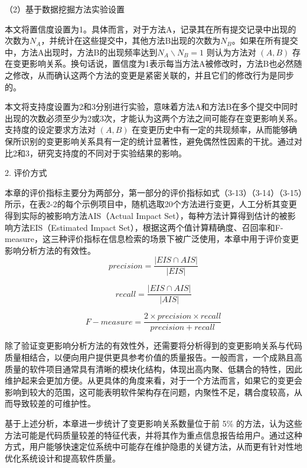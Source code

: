 （2）基于数据挖掘方法实验设置

本文将置信度设置为1。具体而言，对于方法A，记录其在所有提交记录中出现的次数为\(N_A\)，并统计在这些提交中，其他方法B出现的次数为\(N_B\)。如果在所有提交中，方法A出现时，方法B的出现频率达到\(N_A \backslash N_B = 1\)
则认为方法对 $(A, B)$ 存在变更影响关系。换句话说，置信度为1表示每当方法A被修改时，方法B也必然随之修改，从而确认这两个方法的变更是紧密关联的，并且它们的修改行为是同步的。

本文将支持度设置为2和3分别进行实验，意味着方法A和方法B在多个提交中同时出现的次数必须至少为2或3次，才能认为这两个方法之间可能存在变更影响关系。支持度的设定要求方法对 $(A, B)$ 在变更历史中有一定的共现频率，从而能够确保所识别的变更影响关系具有一定的统计显著性，避免偶然性因素的干扰。通过对比2和3，研究支持度的不同对于实验结果的影响。

2. 评价方式

本章的评价指标主要分为两部分，第一部分的评价指标如式（3-13）（3-14）（3-15）所示，在表2-2的每个示例项目中，随机选取20个方法进行变更，人工分析其变更得到实际的被影响方法AIS（Actual Impact Set），每种方法计算得到估计的被影响方法EIS（Estimated Impact Set），根据这两个值计算精确度、召回率和F-measure，这三种评价指标在信息检索的场景下被广泛使用，本章中用于评价变更影响分析方法的有效性。
\begin{equation}
{precision} = \frac{|EIS \cap AIS|}{|EIS|}
\end{equation}

\begin{equation}
{recall} = \frac{|EIS \cap AIS|}{|AIS|}
\end{equation}

\begin{equation}
F-measure = \frac{2 \times precision \times recall}{precision + recall}
\end{equation}

除了验证变更影响分析方法的有效性外，还需要将分析得到的变更影响关系与代码质量相结合，以便向用户提供更具参考价值的质量报告。一般而言，一个成熟且高质量的软件项目通常具有清晰的模块化结构，体现出高内聚、低耦合的特性，因此维护起来会更加方便。从更具体的角度来看，对于一个方法而言，如果它的变更会影响到较大的范围，这可能表明软件架构存在问题，内聚性不足，耦合度较高，从而导致较差的可维护性。

基于上述分析，本章进一步统计了变更影响关系数量位于前 5\% 的方法，认为这些方法可能是代码质量较差的特征代表，并将其作为重点信息报告给用户。通过这种方式，用户能够快速定位系统中可能存在维护隐患的关键方法，从而更有针对性地优化系统设计和提高软件质量。

